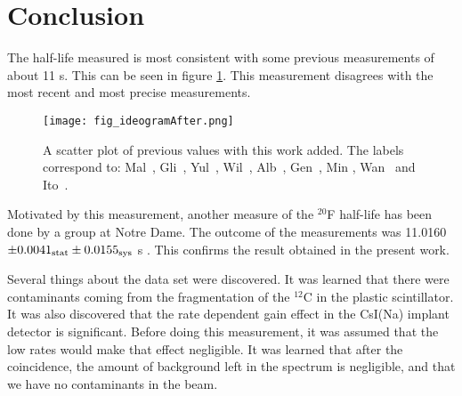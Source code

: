 \documentclass[MaxHughesThesis.tex]{subfiles}
\begin{document}
\section{Conclusion}
\label{sec:conclusion}

The half-life measured is most consistent with some previous measurements of about 11 s. 
This can be seen in figure \ref{fig:ideogramfinal}.
This measurement disagrees with the most recent and most precise measurements.

\begin{figure}[!htb]
\centerline{\texttt{[image: fig\_ideogramAfter.png]}}
\caption{A scatter plot of previous values with this work added.
	 The labels correspond to: Mal~\cite{Mal62}, Gli~\cite{Gli63},
	Yul~\cite{Yul67}, Wil~\cite{Wil70}, Alb~\cite{Alb75}, Gen~\cite{Gen76},
	Min \cite{Min87}, Wan~\cite{Wan92} and Ito~\cite{Ito95}.}
\label{fig:ideogramfinal}
\end{figure}

Motivated by this measurement, another measure of the $^{20}$F half-life has been done by a group at Notre Dame. 
The outcome of the measurements was 11.0160 $ \pm 0.0041_{\rm{stat}} \pm 0.0155_{\rm{sys}}$ s \cite{Bur19}.
This confirms the result obtained in the present work. 

Several things about the data set were discovered.
It was learned that there were contaminants coming from the fragmentation of the $^{12}$C in the plastic scintillator.
It was also discovered that the rate dependent gain effect in the CsI(Na) implant detector is significant.
Before doing this measurement, it was assumed that the low rates would make that effect negligible.
It was learned that after the coincidence, the amount of background left in the spectrum is negligible, and that we have no contaminants in the beam.
\end{document}
